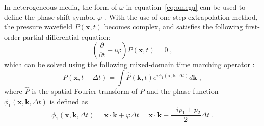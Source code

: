 In heterogeneous media, the form of $\omega$ in equation~\ref{eq:omega} can be used to define the phase shift symbol $\varphi$ \cite[]{zhang09}.
With the use of one-step extrapolation method, the pressure wavefield $P(\mathbf{x}, t)$ becomes complex, and satisfies the following
first-order partial differential equation:
\begin{equation}
	\label{eq:first-order}
	\left( \frac{\partial}{\partial t} + i\varphi \right)P(\mathbf{x}, t) = 0 \; ,
\end{equation}
which can be solved using the following mixed-domain time marching operator \cite[]{sun16}:
\begin{equation}
	\label{eq:march}
	P(\mathbf{x},t+\Delta t) = \int \widehat{P}(\mathbf{k},t) e^{i \phi_1(\mathbf{x},\mathbf{k},\Delta t)} d\mathbf{k} \; ,
\end{equation}
where $\widehat{P}$ is the spatial Fourier transform of $P$ and the phase function $\phi_1(\mathbf{x},\mathbf{k},\Delta t)$ is defined as
\begin{equation}
	\label{eq:phase}
	\phi_1(\mathbf{x},\mathbf{k},\Delta t) = \mathbf{x} \cdot \mathbf{k}+\varphi \Delta t=\mathbf{x} \cdot \mathbf{k}+\frac{-ip_1 +p_2}{2} \Delta t \; .
\end{equation}

